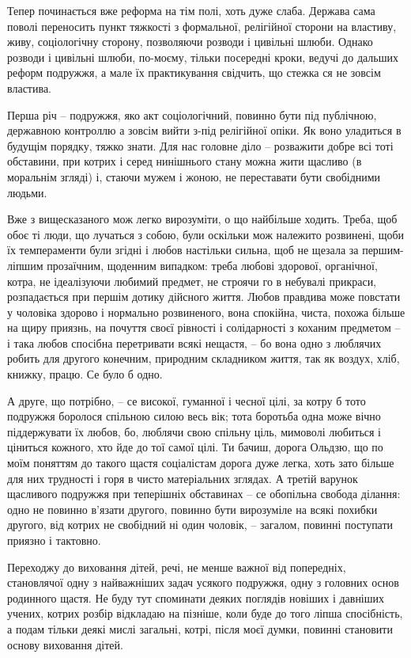 Тепер починається вже реформа на тім полі, хоть дуже слаба. Держава сама поволі
переносить пункт тяжкості з формальної, релігійної сторони на властиву, живу,
соціологічну сторону, позволяючи розводи і цивільні шлюби. Однако розводи і
цивільні шлюби, по-моєму, тільки посередні кроки, ведучі до дальших реформ
подружжя, а мале їх практикування свідчить, що стежка ся не зовсім властива.

Перша річ – подружжя, яко акт соціологічний, повинно бути під публічною,
державною контроллю а зовсім вийти з-під релігійної опіки. Як воно уладиться в
будущім порядку, тяжко знати. Для нас головне діло – розважити добре всі тоті
обставини, при котрих і серед нинішнього стану можна жити щасливо (в моральнім
згляді) і, стаючи мужем і жоною, не переставати бути свобідними людьми.

Вже з вищесказаного мож легко вирозуміти, о що найбільше ходить. Треба, щоб
обоє ті люди, що лучаться з собою, були оскільки мож належито розвинені, щоби
їх темпераменти були згідні і любов настільки сильна, щоб не щезала за
першим-ліпшим прозаїчним, щоденним випадком: треба любові здорової, органічної,
котра, не ідеалізуючи любимий предмет, не строячи го в небувалі прикраси,
розпадається при першім дотику дійсного життя. Любов правдива може повстати у
чоловіка здорово і нормально розвиненого, вона спокійна, чиста, похожа більше
на щиру приязнь, на почуття своєї рівності і солідарності з коханим предметом –
і така любов спосібна перетривати всякі нещастя, – бо вона одно з люблячих
робить для другого конечним, природним складником життя, так як воздух, хліб,
книжку, працю. Се було б одно.

А друге, що потрібно, – се високої, гуманної і чесної цілі, за котру б тото
подружжя боролося спільною силою весь вік; тота боротьба одна може вічно
піддержувати їх любов, бо, люблячи свою спільну ціль, мимоволі любиться і
ціниться кожного, хто йде до тої самої цілі. Ти бачиш, дорога Ольдзю, що по
моїм поняттям до такого щастя соціалістам дорога дуже легка, хоть зато більше
для них трудності і горя в чисто матеріальних зглядах. А третій варунок
щасливого подружжя при теперішніх обставинах – се обопільна свобода ділання:
одно не повинно в’язати другого, повинно бути вирозуміле на всякі похибки
другого, від котрих не свобідний ні один чоловік, – загалом, повинні поступати
приязно і тактовно.

Переходжу до виховання дітей, речі, не менше важної від попередніх, становлячої
одну з найважніших задач усякого подружжя, одну з головних основ родинного
щастя. Не буду тут споминати деяких поглядів новіших і давніших учених, котрих
розбір відкладаю на пізніше, коли буде до того ліпша спосібність, а подам
тільки деякі мислі загальні, котрі, після моєї думки, повинні становити основу
виховання дітей.

